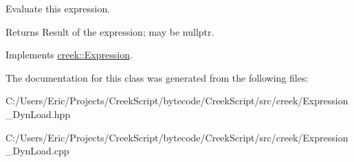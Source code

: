 Evaluate this expression. 

\begin{DoxyReturn}{Returns}
Result of the expression; may be {\ttfamily nullptr}. 
\end{DoxyReturn}


Implements \hyperlink{classcreek_1_1_expression_a3c7fe4a04e24c8d907f918240e2bf43d}{creek\+::\+Expression}.



The documentation for this class was generated from the following files\+:\begin{DoxyCompactItemize}
\item 
C\+:/\+Users/\+Eric/\+Projects/\+Creek\+Script/bytecode/\+Creek\+Script/src/creek/Expression\+\_\+\+Dyn\+Load.\+hpp\item 
C\+:/\+Users/\+Eric/\+Projects/\+Creek\+Script/bytecode/\+Creek\+Script/src/creek/Expression\+\_\+\+Dyn\+Load.\+cpp\end{DoxyCompactItemize}
